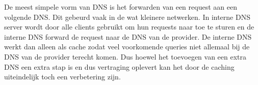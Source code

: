 De meest simpele vorm van DNS is het forwarden van een request aan een volgende DNS. Dit gebeurd vaak in de wat kleinere netwerken. In interne DNS server wordt door alle clients gebruikt om hun requests naar toe te sturen en de interne DNS forward de request naar de DNS van de provider. De interne DNS werkt dan alleen als cache zodat veel voorkomende queries niet allemaal bij de DNS van de provider terecht komen. Dus hoewel het toevoegen van een extra DNS een extra stap is en dus vertraging oplevert kan het door de caching uiteindelijk toch een verbetering zijn.

